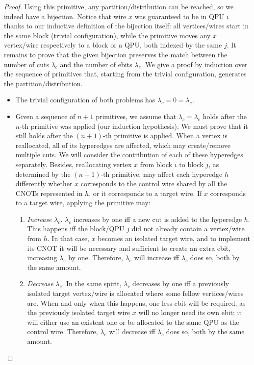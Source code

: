 \begin{proof}
Using this primitive, any partition/distribution can be reached, so we indeed have a bijection. Notice that wire \(x\) was guaranteed to be in QPU \(i\) thanks to our inductive definition of the bijection itself: all vertices/wires start in the same block (trivial configuration), while the primitive moves any \(x\) vertex/wire respectively to a block or a QPU, both indexed by the same \(j\). It remains to prove that the given bijection preserves the match between the number of cuts \(\lambda_c\) and the number of ebits \(\lambda_e\). We give a proof by induction over the sequence of primitives that, starting from the trivial configuration, generates the partition/distribution.

\begin{itemize}
  \item The trivial configuration of both problems has \(\lambda_c = 0 = \lambda_e\).
  \item Given a sequence of \(n+1\) primitives, we assume that \(\lambda_c = \lambda_e\) holds after the \(n\)-th primitive was applied (our induction hypothesis). We must prove that it still holds after the \((n+1)\)-th primitive is applied. When a vertex is reallocated, all of its hyperedges are affected, which may create/remove multiple cuts. We will consider the contribution of each of these hyperedges separately. Besides, reallocating vertex \(x\) from block \(i\) to block \(j\), as determined by the \((n+1)\)-th primitive, may affect each hyperedge \(h\) differently whether \(x\) corresponds to the control wire shared by all the CNOTs represented in \(h\), or it corresponds to a target wire. If \(x\) corresponds to a target wire, applying the primitive may:
    \begin{enumerate}
    \renewcommand{\theenumi}{\alph{enumi})}
      \item \textit{Increase} \(\lambda_c\). \(\lambda_c\) increases by one iff a new cut is added to the hyperedge \(h\). This happens iff the block/QPU \(j\) did not already contain a vertex/wire from \(h\). In that case, \(x\) becomes an isolated target wire, and to implement its CNOT it will be necessary and sufficient to create an extra ebit, increasing \(\lambda_e\) by one. Therefore, \(\lambda_e\) will increase iff \(\lambda_c\) does so, both by the same amount.
      \item \textit{Decrease} \(\lambda_c\). In the same spirit, \(\lambda_c\) decreases by one iff a previously isolated target vertex/wire is allocated where some fellow vertices/wires are. When and only when this happens, one less ebit will be required, as the previously isolated target wire \(x\) will no longer need its own ebit: it will either use an existent one or be allocated to the same QPU as the control wire. Therefore, \(\lambda_e\) will decrease iff \(\lambda_c\) does so, both by the same amount.
    \end{enumerate}
\end{itemize}


\end{proof}
